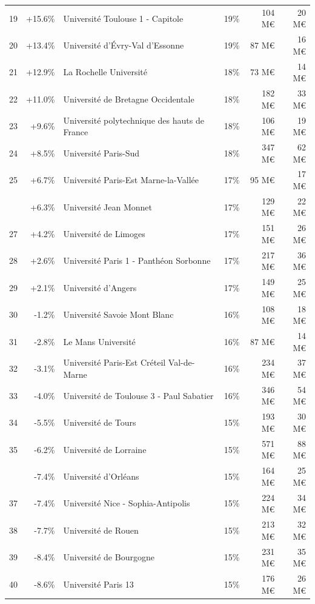 \documentclass[12pt,french,]{article}
\begin{document}
\begin{longtable}{rrlrrr}
\rowcolor{gray!6}  19 & +15.6\% & Université Toulouse 1 - Capitole & 19\% & 104 M€ & 20 M€\\
20 & +13.4\% & Université d'Évry-Val d'Essonne & 19\% & 87 M€ & 16 M€\\
\addlinespace
\rowcolor{gray!6}  21 & +12.9\% & La Rochelle Université & 18\% & 73 M€ & 14 M€\\
22 & +11.0\% & Université de Bretagne Occidentale & 18\% & 182 M€ & 33 M€\\
\rowcolor{gray!6}  23 & +9.6\% & Université polytechnique des hauts de France & 18\% & 106 M€ & 19 M€\\
24 & +8.5\% & Université Paris-Sud & 18\% & 347 M€ & 62 M€\\
\rowcolor{gray!6}  25 & +6.7\% & Université Paris-Est Marne-la-Vallée & 17\% & 95 M€ & 17 M€\\
\addlinespace
26 & +6.3\% & Université Jean Monnet & 17\% & 129 M€ & 22 M€\\
\rowcolor{gray!6}  27 & +4.2\% & Université de Limoges & 17\% & 151 M€ & 26 M€\\
28 & +2.6\% & Université Paris 1 - Panthéon Sorbonne & 17\% & 217 M€ & 36 M€\\
\rowcolor{gray!6}  29 & +2.1\% & Université d'Angers & 17\% & 149 M€ & 25 M€\\
30 & -1.2\% & Université Savoie Mont Blanc & 16\% & 108 M€ & 18 M€\\
\addlinespace
\rowcolor{gray!6}  31 & -2.8\% & Le Mans Université & 16\% & 87 M€ & 14 M€\\
32 & -3.1\% & Université Paris-Est Créteil Val-de-Marne & 16\% & 234 M€ & 37 M€\\
\rowcolor{gray!6}  33 & -4.0\% & Université de Toulouse 3 - Paul Sabatier & 16\% & 346 M€ & 54 M€\\
34 & -5.5\% & Université de Tours & 15\% & 193 M€ & 30 M€\\
\rowcolor{gray!6}  35 & -6.2\% & Université de Lorraine & 15\% & 571 M€ & 88 M€\\
\addlinespace
36 & -7.4\% & Université d'Orléans & 15\% & 164 M€ & 25 M€\\
\rowcolor{gray!6}  37 & -7.4\% & Université Nice - Sophia-Antipolis & 15\% & 224 M€ & 34 M€\\
38 & -7.7\% & Université de Rouen & 15\% & 213 M€ & 32 M€\\
\rowcolor{gray!6}  39 & -8.4\% & Université de Bourgogne & 15\% & 231 M€ & 35 M€\\
40 & -8.6\% & Université Paris 13 & 15\% & 176 M€ & 26 M€\\

\end{longtable}
\end{document}
